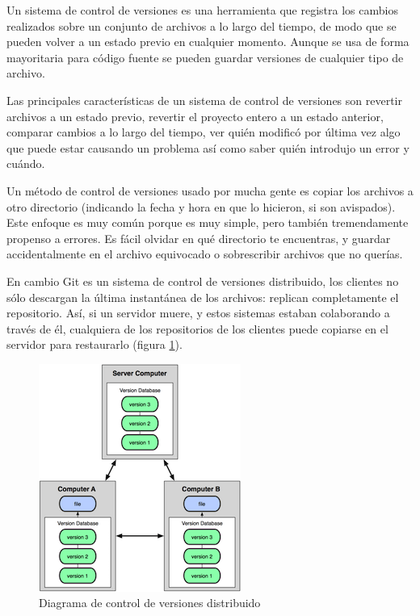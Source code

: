 Un sistema de control de versiones es una herramienta que registra los cambios realizados sobre un conjunto de archivos a lo largo del tiempo, de modo que se pueden volver a un estado previo en cualquier momento. Aunque se usa de forma mayoritaria para código fuente  se pueden guardar versiones de cualquier tipo de archivo.

\bigskip
Las principales características de un sistema de control de versiones son revertir archivos a un estado previo, revertir el proyecto entero a un estado anterior, comparar cambios a lo largo del tiempo, ver quién modificó por última vez algo que puede estar causando un problema así como saber quién introdujo un error y cuándo.

\bigskip
Un método de control de versiones usado por mucha gente es copiar los archivos a otro directorio (indicando la fecha y hora en que lo hicieron, si son avispados). Este enfoque es muy común porque es muy simple, pero también tremendamente propenso a errores. Es fácil olvidar en qué directorio te encuentras, y guardar accidentalmente en el archivo equivocado o sobrescribir archivos que no querías.

\bigskip
En cambio Git es un sistema de control de versiones distribuido, los clientes no sólo descargan la última instantánea de los archivos: replican completamente el repositorio. Así, si un servidor muere, y estos sistemas estaban colaborando a través de él, cualquiera de los repositorios de los clientes puede copiarse en el servidor para restaurarlo (figura \ref{fig:dvcs}).

\begin{figure}[h!]
\centering
\includegraphics{../images/dvcs}
\caption{Diagrama de control de versiones distribuido}
\label{fig:dvcs}
\end{figure}

